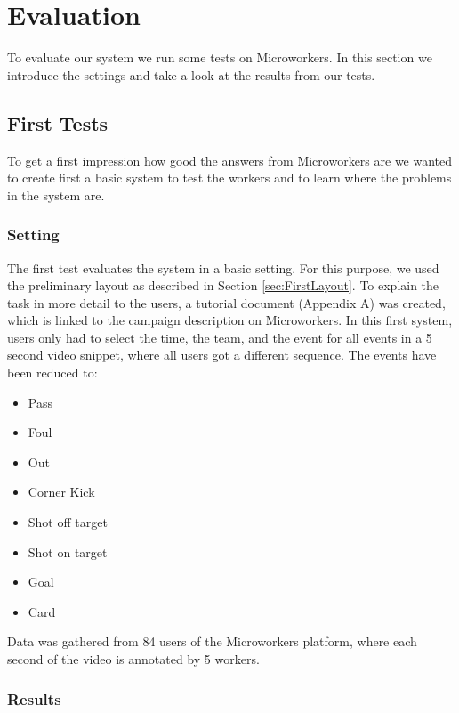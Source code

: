 \chapter{Evaluation}

To evaluate our system we run some tests on Microworkers. In this section we introduce the settings and take a look at the results from our tests.

\section{First Tests}\label{sec:firstTest}

To get a first impression how good the answers from Microworkers are we wanted to create first a basic system to test the workers and to learn where the problems in the system are.

\subsection{Setting}
The first test evaluates the system in a basic setting. For this purpose, we used the preliminary layout as described in Section \ref{sec:FirstLayout}.
To explain the task in more detail to the users, a tutorial document (Appendix A) was created, which is linked to the campaign description on Microworkers.\newline
\newline
In this first system, users only had to select the time, the team, and the event for all events in a 5 second video snippet, where all users got a different sequence.
The events have been reduced to:
\begin{itemize}
	\setlength{\itemsep}{1pt}
	\setlength{\parskip}{1pt}
	\item Pass
	\item Foul
	\item Out
	\item Corner Kick
	\item Shot off target
	\item Shot on target
	\item Goal
	\item Card
\end{itemize}

Data was gathered from 84 users of the Microworkers platform, where each second of the video is annotated by 5 workers.


\subsection{Results}

